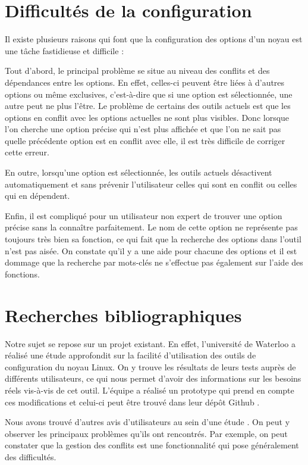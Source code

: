 \documentclass[16pts]{report}
\begin{document}
\section{Difficultés de la configuration}
\label{sec:Difficultés de la configuration}


Il existe plusieurs raisons qui font que la configuration des options d’un
noyau est une tâche fastidieuse et difficile :

Tout d’abord, le principal problème se situe au niveau des conflits et des
dépendances entre les options. En effet, celles-ci peuvent être liées à
d’autres options ou même exclusives, c’est-à-dire que si une option est
sélectionnée, une autre peut ne plus l’être.  Le problème de certains des
outils actuels est que les options en conflit avec les options actuelles ne
sont plus visibles. Donc lorsque l’on cherche une option précise qui n’est plus
affichée et que l’on ne sait pas quelle précédente option est en conflit avec
elle, il est très difficile de corriger cette erreur.

En outre, lorsqu'une option est sélectionnée, les outils actuels désactivent
automatiquement et sans prévenir l'utilisateur celles qui sont en conflit ou
celles qui en dépendent.

Enfin, il est compliqué pour un utilisateur non expert de trouver une option
précise sans la connaître parfaitement. Le nom de cette option ne représente
pas toujours très bien sa fonction, ce qui fait que la recherche des options
dans l’outil n’est pas aisée.  On constate qu’il y a une aide pour chacune des
options et il est dommage que la recherche par mots-clés ne s’effectue pas
également sur l’aide des fonctions.

\section{Recherches bibliographiques}
\label{sec:Recherches bibliographiques}


Notre sujet se repose sur un projet existant. En effet, l'université de
Waterloo a réalisé une étude approfondit \cite{Waterloo:Etude} sur la facilité
d'utilisation des outils de configuration du noyau Linux. On y trouve les
résultats de leurs tests auprès de différents utilisateurs, ce qui nous permet
d'avoir des informations sur les besoins réels vis-à-vis de cet outil. L'équipe
a réalisé un prototype qui prend en compte ces modifications et celui-ci peut
être trouvé dans leur dépôt Github \cite{Waterloo:Github}.

Nous avons trouvé d'autres avis d'utilisateurs au sein d'une étude
\cite{Hubaux:2012:USC:2110147.2110164}. On peut y observer les principaux
problèmes qu'ils ont rencontrés. Par exemple, on peut constater que la gestion
des conflits est une fonctionnalité qui pose généralement des difficultés.
\end{document}
